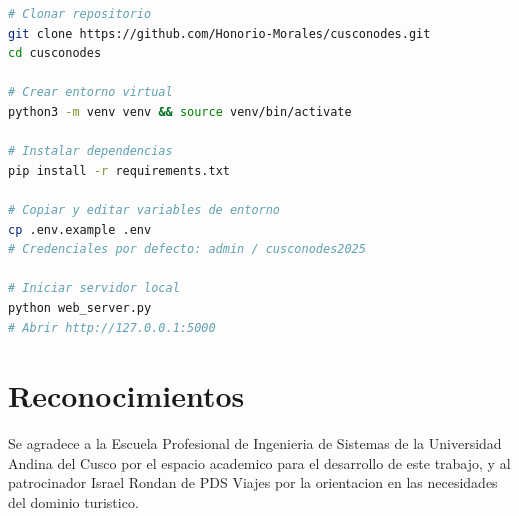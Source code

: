 \documentclass[10pt,twocolumn,a4paper]{article}
\begin{document}
\begin{lstlisting}[language=bash, numbers=none, frame=single,
  basicstyle=\ttfamily\fontsize{8}{9}\selectfont]
# Clonar repositorio
git clone https://github.com/Honorio-Morales/cusconodes.git
cd cusconodes

# Crear entorno virtual
python3 -m venv venv && source venv/bin/activate

# Instalar dependencias
pip install -r requirements.txt

# Copiar y editar variables de entorno
cp .env.example .env
# Credenciales por defecto: admin / cusconodes2025

# Iniciar servidor local
python web_server.py
# Abrir http://127.0.0.1:5000
\end{lstlisting}

\section*{Reconocimientos}

Se agradece a la Escuela Profesional de Ingenieria de Sistemas de
la Universidad Andina del Cusco por el espacio academico para el
desarrollo de este trabajo, y al patrocinador Israel Rondan de PDS
Viajes por la orientacion en las necesidades del dominio turistico.

\end{document}
